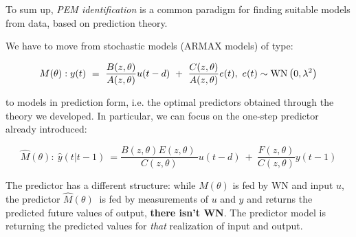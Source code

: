 

To sum up, \textit{PEM identification} is a common paradigm for finding suitable models from data, based on prediction theory.

We have to move from stochastic models (ARMAX models) of type: 

$$
M(\theta):
y( t) \ =\ \frac{B( z,\theta )}{A( z,\theta )} u( t-d) \ +\ \frac{C( z,\theta )}{A( z,\theta )} e( t) ,\ e( t)\sim \operatorname{WN} \left( 0,\lambda ^{2}\right)
$$

to models in prediction form, i.e. the optimal predictors obtained through the theory we developed. In particular, we can focus on the one-step predictor already introduced:

$$
\hat{M}( \theta ) :
\ \hat{y}( t|t-1) \ =\frac{B( z,\theta ) E( z,\theta ) \ }{C( z,\theta )} u( t-d) \ +\ \frac{F( z,\theta )}{C( z,\theta )} y( t-1)
$$

The predictor has a different structure: while $ M( \theta )$ is fed by WN and input $ u$, the predictor $ \hat{M}( \theta ) \ $ is fed by measurements of $ u$ and $ y$ and returns the predicted future values of output, \textbf{there isn't WN}. The predictor model is returning the predicted values for \textit{that} realization of input and output.



